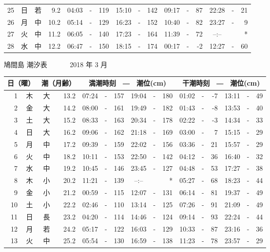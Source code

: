 \documentclass[12pt.a4j]{jsarticle}
\begin{document}
\begin{center}
\begin{table}[ht]
\begin{tabular}{|rc|cr|ccrccr|ccrccr|}
25 & 日 & 若 &  9.2 & 04:03 &-& 119 & 15:10 &-& 142 & 09:17 &-&  87 & 22:28 &-&  21 \\
26 & 月 & 中 & 10.2 & 05:14 &-& 129 & 16:23 &-& 152 & 10:40 &-&  82 & 23:27 &-&   9 \\
27 & 火 & 中 & 11.2 & 06:05 &-& 140 & 17:23 &-& 164 & 11:39 &-&  72 & --:-- & &  *  \\
28 & 水 & 中 & 12.2 & 06:47 &-& 150 & 18:15 &-& 174 & 00:17 &-&  -2 & 12:27 &-&  60 \\
\hline
\end{tabular}
\end{table}
\newpage
{\LARGE 鳩間島  潮汐表　　　}
{\large 2018 年  3 月}\\
\begin{table}[ht]
\begin{tabular}{|rc|cr|ccrccr|ccrccr|}
\hline
\multicolumn{2}{|c|}{日（曜）} & \multicolumn{2}{c|}{潮（月齢）} & \multicolumn{6}{c|}{満潮時刻　―　潮位(cm)} & \multicolumn{6}{c|}{干潮時刻　―　潮位(cm)} \\
\hline
 1 & 木 & 大 & 13.2 & 07:24 &-& 157 & 19:04 &-& 180 & 01:02 &-&  -7 & 13:11 &-&  49 \\
 2 & 金 & 大 & 14.2 & 08:00 &-& 161 & 19:49 &-& 182 & 01:43 &-&  -8 & 13:53 &-&  40 \\
 3 & 土 & 大 & 15.2 & 08:33 &-& 163 & 20:34 &-& 178 & 02:22 &-&  -3 & 14:34 &-&  33 \\
 4 & 日 & 大 & 16.2 & 09:06 &-& 162 & 21:18 &-& 169 & 03:00 &-&   7 & 15:15 &-&  29 \\
 5 & 月 & 中 & 17.2 & 09:39 &-& 159 & 22:02 &-& 156 & 03:36 &-&  21 & 15:57 &-&  29 \\
 6 & 火 & 中 & 18.2 & 10:11 &-& 153 & 22:50 &-& 142 & 04:12 &-&  36 & 16:40 &-&  32 \\
 7 & 水 & 中 & 19.2 & 10:45 &-& 146 & 23:45 &-& 127 & 04:48 &-&  53 & 17:27 &-&  38 \\
 8 & 木 & 小 & 20.2 & 11:21 &-& 139 & --:-- & &  *  & 05:27 &-&  68 & 18:23 &-&  44 \\
 9 & 金 & 小 & 21.2 & 00:59 &-& 115 & 12:07 &-& 131 & 06:14 &-&  81 & 19:37 &-&  49 \\
10 & 土 & 小 & 22.2 & 02:46 &-& 110 & 13:14 &-& 125 & 07:26 &-&  91 & 21:09 &-&  49 \\
11 & 日 & 長 & 23.2 & 04:20 &-& 114 & 14:46 &-& 124 & 09:14 &-&  93 & 22:24 &-&  44 \\
12 & 月 & 若 & 24.2 & 05:17 &-& 122 & 16:03 &-& 129 & 10:33 &-&  87 & 23:16 &-&  36 \\
13 & 火 & 中 & 25.2 & 05:54 &-& 130 & 16:59 &-& 138 & 11:23 &-&  78 & 23:57 &-&  29 \\

\end{tabular}
\end{table}
\end{center}
\end{document}
